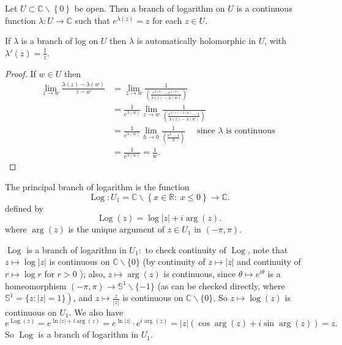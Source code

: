 \documentclass[egregdoesnotlikesansseriftitles,a4paper]{scrartcl}
\begin{document}
\begin{definition*}
      Let $U \subset \mathbb{C} \backslash \left\{0\right\}$ be open. Then a branch of logarithm on $U$ is a continuous function $\lambda: U \rightarrow \mathbb{C}$ such that $e^{\lambda (z)}=z$ for each $z \in U$.
\end{definition*}
\begin{proposition}
      If $\lambda$ is a branch of log on $U$ then $\lambda$ is automatically holomorphic in $U$, with $\lambda' (z)=\frac{1}{z}$.
\end{proposition}
\begin{proof}
      If $w \in U$ then 
      \begin{align*}
           \lim_{z \rightarrow w} \frac{\lambda (z)- \lambda (w)}{z-w}&=\lim_{z \rightarrow w} \frac{1}{\left( \frac{e^{\lambda (z)}-e^{\lambda (w)}}{\lambda (z)- \lambda (w)}\right)}\\
           &=\frac{1}{e^{\lambda (w)}}\lim_{z \rightarrow w} \frac{1}{\left(\frac{e^{\lambda (z)-\lambda (w)}-1}{\lambda (z)- \lambda (w)}\right)}\\
           &=\frac{1}{e^{\lambda (w)}} \lim_{h \rightarrow 0} \frac{1}{\left( \frac{e^{h}-1}{h}\right)} \quad \text{ since } \lambda \text{ is continuous } \\
           &=\frac{1}{e^{\lambda (w)}}=\frac{1}{w}.
      \end{align*}
\end{proof}
\begin{definition*}
      The principal branch of logarithm is the function \[
      \operatorname{Log}: U_1 =\mathbb{C} \backslash \left\{x \in \mathbb{R}: \ x \leq 0\right\} \rightarrow \mathbb{C}
      .\] defined by \[
      \operatorname{Log}(z)= \operatorname{log}|z|+i \operatorname{arg}(z)
      .\] where $\operatorname{arg}(z)$ is the unique argument of $z \in U_1 $ in $(-\pi,\pi)$.
\end{definition*}
\begin{remark}
     $\operatorname{Log}$ is a branch of logarithm in $U_{1}:$ to check continuity of $\operatorname{Log}$, note that
     $z \mapsto \log |z|$ is continuous on $\mathbb{C} \backslash\{0\}$ (by continuity of $z \mapsto|z|$ and
     continuity of $r \mapsto \log r$ for $r>0$ ); also, $z \mapsto \arg (z)$ is continuous, since
     $\theta \mapsto e^{i \theta}$ is a homeomorphism $(-\pi, \pi) \rightarrow \mathbb{S}^{1} \backslash\{-1\}$ (as can be checked
     directly, where $\left.\mathbb{S}^{1}=\{z:|z|=1\}\right)$, and $z \mapsto \frac{z}{|z|}$ is continuous on
     $\mathbb{C} \backslash\{0\} .$ So $z \mapsto \log (z)$ is continuous on $U_{1}$.
     We also have \[
          e^{\operatorname{Log} (z)}=e^{\ln |z|+i \arg (z)}=e^{\ln |z|} \cdot e^{i \text { arg }(z)}=
          |z|(\cos \arg (z)+i \sin \arg (z))=z
     .\]  So $\operatorname{Log}$ is a branch of logarithm in $U_{1}$.
\end{remark}
\end{document}
